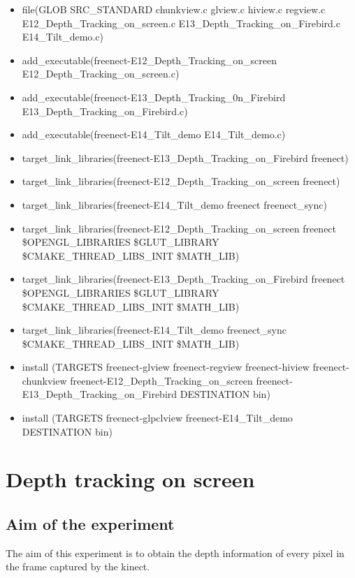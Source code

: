 \begin{flushleft}
\begin{itemize}
\item file(GLOB SRC\_STANDARD chunkview.c glview.c hiview.c regview.c  E12\_Depth\_Tracking\_on\_screen.c E13\_Depth\_Tracking\_on\_Firebird.c E14\_Tilt\_demo.c)
\item add\_executable(freenect-E12\_Depth\_Tracking\_on\_screen E12\_Depth\_Tracking\_on\_screen.c)
\item add\_executable(freenect-E13\_Depth\_Tracking\_0n\_Firebird E13\_Depth\_Tracking\_on\_Firebird.c)
\item add\_executable(freenect-E14\_Tilt\_demo E14\_Tilt\_demo.c)
\item target\_link\_libraries(freenect-E13\_Depth\_Tracking\_on\_Firebird freenect)
\item target\_link\_libraries(freenect-E12\_Depth\_Tracking\_on\_screen freenect)
\item target\_link\_libraries(freenect-E14\_Tilt\_demo freenect freenect\_sync)
\item target\_link\_libraries(freenect-E12\_Depth\_Tracking\_on\_screen freenect \${OPENGL\_LIBRARIES} \${GLUT\_LIBRARY} \${CMAKE\_THREAD\_LIBS\_INIT} \${MATH\_LIB})
\item target\_link\_libraries(freenect-E13\_Depth\_Tracking\_on\_Firebird freenect \${OPENGL\_LIBRARIES} \${GLUT\_LIBRARY} \${CMAKE\_THREAD\_LIBS\_INIT} \${MATH\_LIB})
\item target\_link\_libraries(freenect-E14\_Tilt\_demo freenect\_sync \${CMAKE\_THREAD\_LIBS\_INIT} \${MATH\_LIB})
\item install (TARGETS freenect-glview freenect-regview freenect-hiview freenect-chunkview freenect-E12\_Depth\_Tracking\_on\_screen freenect-E13\_Depth\_Tracking\_on\_Firebird
  DESTINATION bin)
\item install (TARGETS freenect-glpclview freenect-E14\_Tilt\_demo 
      DESTINATION bin)
\end{itemize}
\newpage
{}
\section{\textbf{ Depth tracking on screen}}
\label{4.12}

\medskip
\subsection{\textbf{ Aim of the experiment}}
The aim of this experiment is to obtain the depth information of every pixel in the frame captured by the kinect.
\medskip


\end{flushleft}
